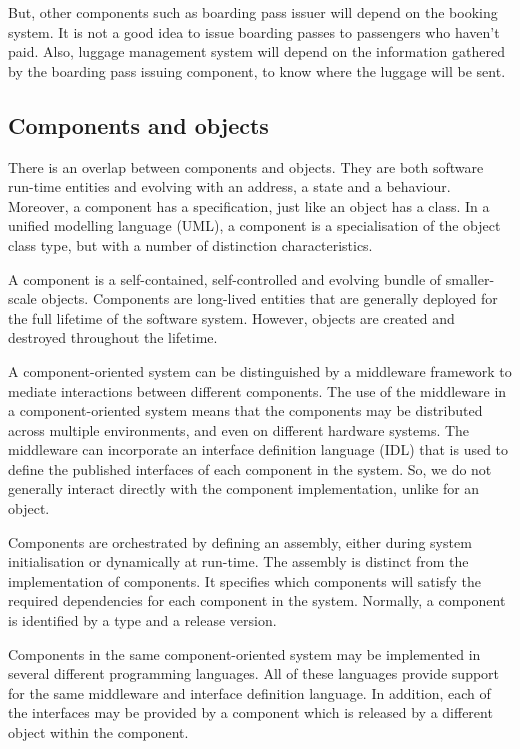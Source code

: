 \documentclass[a4paper, openany]{memoir}
\begin{document}
But, other components such as boarding pass issuer will depend on the booking system. It is not a good idea to issue boarding passes to passengers who haven't paid. Also, luggage management system will depend on the information gathered by the boarding pass issuing component, to know where the luggage will be sent.

\subsection{Components and objects}
There is an overlap between components and objects. They are both software run-time entities and evolving with an address, a state and a behaviour. Moreover, a component has a specification, just like an object has a  class. In a unified modelling language (UML), a component is a specialisation of the object class type, but with a number of distinction characteristics.

A component is a self-contained, self-controlled and evolving bundle of smaller-scale objects. Components are long-lived entities that are generally deployed for the full lifetime of the software system. However, objects are created and destroyed throughout the lifetime. 

A component-oriented system can be distinguished by a middleware framework to mediate interactions between different components. The use of the middleware in a component-oriented system means that the components may be distributed across multiple environments, and even on different hardware systems. The middleware can incorporate an interface definition language (IDL) that is used to define the published interfaces of each component in the system. So, we do not generally interact directly with the component implementation, unlike for an object.

Components are orchestrated by defining an assembly, either during system initialisation or dynamically at run-time. The assembly is distinct from the implementation of components. It specifies which components will satisfy the required dependencies for each component in the system. Normally, a component is identified by a type and a release version.

Components in the same component-oriented system may be implemented in several different programming languages. All of these languages provide support for the same middleware and interface definition language. In addition, each of the interfaces may be provided by a component which is released by a different object within the component.
\end{document}

